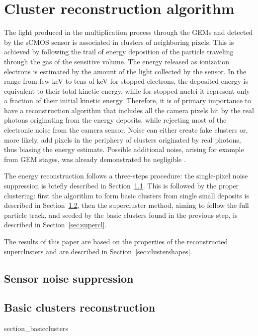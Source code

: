 \documentclass[12pt]{iopart}
\begin{document}
\clearpage
 
\section{Cluster reconstruction algorithm}
\label{sec:clustering}
The light produced in the multiplication process through the GEMs and
detected by the sCMOS sensor is associated in clusters of neighboring
pixels. This is achieved by following the trail of energy deposition
of the particle traveling through the gas of the sensitive volume. The
energy released as ionization electrons is estimated by the amount of
the light collected by the sensor.  In the range from few keV to tens
of keV for stopped electrons, the deposited energy is equivalent to
their total kinetic energy, while for stopped nuclei it represent only
a fraction of their initial kinetic energy.  Therefore, it is of
primary importance to have a reconstruction algorithm that includes
all the camera pixels hit by the real photons originating from the
energy deposits, while rejecting most of the electronic noise from the
camera sensor. Noise can either create fake clusters or, more likely,
add pixels in the periphery of clusters originated by real photons,
thus biasing the energy estimate.  Possible additional noise, arising
for example from GEM stages, was already demonstrated be negligible
\cite{bib:fe55}.

The energy reconstruction follows a three-steps procedure: the
single-pixel noise suppression is briefly described in
Section~\ref{sec:zerosuppression}. This is followed by the proper
clustering: first the algorithm to form basic clusters from single
small deposits is described in Section~\ref{sec:basiccl}, then the
supercluster method, aiming to follow the full particle track, and
seeded by the basic clusters found in the previous step, is described
in Section~\ref{sec:supercl}.

The results of this paper are based on the properties of the
reconstructed superclusters and are described in
Section~\ref{sec:clustershapes}.


\subsection{Sensor noise suppression}
\label{sec:zerosuppression}



\subsection{Basic clusters reconstruction}
\label{sec:basiccl}
 {section_basicclusters}
\end{document}
